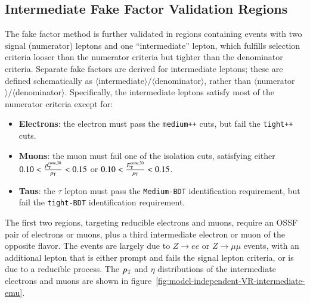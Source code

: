 \subsection{Intermediate Fake Factor Validation Regions}\label{sec:model-independent-validation-regions-intermediate-ff}
The fake factor method is further validated in regions containing events with two signal (numerator) leptons and one ``intermediate'' lepton, which fulfills selection criteria looser than the numerator criteria but tighter than the denominator criteria. Separate fake factors are derived for intermediate leptons; these are defined schematically as $\langle$intermediate$\rangle/\langle$denominator$\rangle$, rather than $\langle$numerator$\rangle/\langle$denominator$\rangle$. Specifically, the intermediate leptons satisfy most of the numerator criteria except for:

\begin{itemize}
	\item \textbf{Electrons}: the electron must pass the \texttt{medium++} cuts, but fail the \texttt{tight++} cuts.  
	\item \textbf{Muons}: the muon must fail one of the isolation cuts, satisfying either $0.10<{\footnotesize \frac{p_{\mathrm{T}}^{\mathrm{cone},30}}{p_{\text{T}}}}<0.15$ or $0.10<{\footnotesize \frac{E_{\mathrm{T}}^{\mathrm{cone},30}}{p_{\text{T}}}}<0.15$. 
	\item \textbf{Taus}: the $\tau$ lepton must pass the \texttt{Medium-BDT} identification requirement, but fail the
	\texttt{tight-BDT} identification requirement.
\end{itemize}

The first two regions, targeting reducible electrons and muons, require an OSSF pair of electrons or muons, plus a third intermediate electron or muon of the opposite flavor. The events are largely due to $Z\rightarrow ee$ or $Z\rightarrow \mu\mu$ events, with an additional lepton that is either prompt and fails the signal lepton criteria, or is due to a reducible process. The $p_{\text{T}}$ and $\eta$ distributions of the intermediate electrons and muons are shown in figure~\ref{fig:model-independent-VR-intermediate-emu}.

